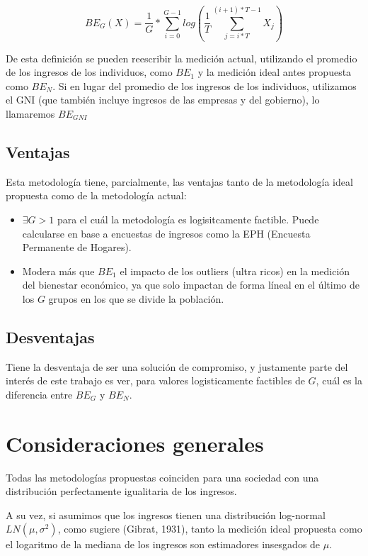 $$
    BE_G(X) = \frac{1}{G} * \sum_{i=0}^{G-1}log(\frac{1}{T} \sum_{j=i*T}^{(i+1)*T-1}X_j)
$$

De esta definición se pueden reescribir la medición actual, utilizando el promedio de los ingresos de los individuos, como $BE_1$ y la medición ideal antes propuesta como $BE_N$. Si en lugar del promedio de los ingresos de los individuos, utilizamos el GNI (que también incluye ingresos de las empresas y del gobierno), lo llamaremos $BE_{GNI}$

\subsection{Ventajas}

Esta metodología tiene, parcialmente, las ventajas tanto de la metodología ideal propuesta como de la metodología actual:

\begin{itemize}
    \item $\exists G>1$ para el cuál la metodología es logisitcamente factible. Puede calcularse en base a encuestas de ingresos como la EPH (Encuesta Permanente de Hogares).
    \item Modera más que $BE_1$ el impacto de los outliers (ultra ricos) en la medición del bienestar económico, ya que solo impactan de forma líneal en el último de los $G$ grupos en los que se divide la población.
\end{itemize}

\subsection{Desventajas}

Tiene la desventaja de ser una solución de compromiso, y justamente parte del interés de este trabajo es ver, para valores logisticamente factibles de $G$, cuál es la diferencia entre $BE_G$ y $BE_N$.

\section{Consideraciones generales}


Todas las metodologías propuestas coinciden para una sociedad con una distribución perfectamente igualitaria de los ingresos.

A su vez, si asumimos que los ingresos tienen una distribución log-normal $LN(\mu,\sigma^2)$, como sugiere (Gibrat, 1931)\cite{gibrat1931inégalités}, tanto la medición ideal propuesta como el logaritmo de la mediana de los ingresos son estimadores insesgados de $\mu$.